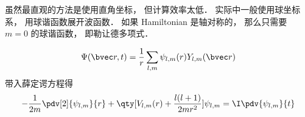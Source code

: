 
虽然最直观的方法是使用直角坐标， 但计算效率太低． 实际中一般使用球坐标系， 用球谐函数展开波函数． 如果 Hamiltonian 是轴对称的， 那么只需要 $m = 0$ 的球谐函数， 即勒让德多项式．

\begin{equation}
\Psi(\bvec r, t) = \frac{1}{r}\sum_{l,m} \psi_{l,m}(r) Y_{l,m}(\bvec r)
\end{equation}
带入薛定谔方程得
\begin{equation}
-\frac{1}{2m} \pdv[2]{\psi_{l,m}}{r} + \qty[V_{l,m}(r) + \frac{l(l+1)}{2mr^2}]\psi_{l,m} = \I \pdv{\psi_{l,m}}{t}
\end{equation}
